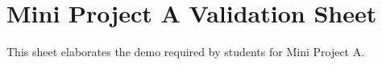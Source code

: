 \section{Mini Project A Validation Sheet}
This sheet elaborates the demo required by students for Mini Project A.
